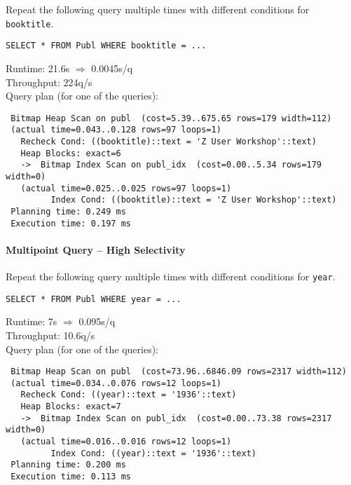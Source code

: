 \documentclass[11pt]{scrartcl}
\begin{document}
Repeat the following query multiple times with different conditions for {\tt booktitle}.

{\small
\begin{verbatim}
SELECT * FROM Publ WHERE booktitle = ...
\end{verbatim}
}

\noindent
\condB

\smallskip\noindent
Runtime: 21.6s $\Rightarrow$ 0.0045s/q\\
Throughput: 224q/s\\

\smallskip\noindent
Query plan (for one of the queries):
{\small
\begin{verbatim}
 Bitmap Heap Scan on publ  (cost=5.39..675.65 rows=179 width=112)
 (actual time=0.043..0.128 rows=97 loops=1)
   Recheck Cond: ((booktitle)::text = 'Z User Workshop'::text)
   Heap Blocks: exact=6
   ->  Bitmap Index Scan on publ_idx  (cost=0.00..5.34 rows=179 width=0)
   (actual time=0.025..0.025 rows=97 loops=1)
         Index Cond: ((booktitle)::text = 'Z User Workshop'::text)
 Planning time: 0.249 ms
 Execution time: 0.197 ms
\end{verbatim}
}


\paragraph{Multipoint Query -- High Selectivity}

Repeat the following query multiple times with different conditions for {\tt year}.

{\small
\begin{verbatim}
SELECT * FROM Publ WHERE year = ...
\end{verbatim}
}

\noindent
\condC

\smallskip\noindent
Runtime: 7s $\Rightarrow$ 0.095s/q\\
Throughput: 10.6q/s\\

\smallskip\noindent
Query plan (for one of the queries):
{\small
\begin{verbatim}
 Bitmap Heap Scan on publ  (cost=73.96..6846.09 rows=2317 width=112)
 (actual time=0.034..0.076 rows=12 loops=1)
   Recheck Cond: ((year)::text = '1936'::text)
   Heap Blocks: exact=7
   ->  Bitmap Index Scan on publ_idx  (cost=0.00..73.38 rows=2317 width=0)
   (actual time=0.016..0.016 rows=12 loops=1)
         Index Cond: ((year)::text = '1936'::text)
 Planning time: 0.200 ms
 Execution time: 0.113 ms
\end{verbatim}
}
\end{document}
